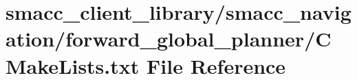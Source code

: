 \hypertarget{client__library_2smacc__navigation_2forward__global__planner_2CMakeLists_8txt}{}\section{smacc\+\_\+client\+\_\+library/smacc\+\_\+navigation/forward\+\_\+global\+\_\+planner/\+C\+Make\+Lists.txt File Reference}
\label{client__library_2smacc__navigation_2forward__global__planner_2CMakeLists_8txt}
